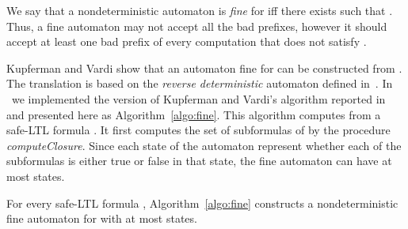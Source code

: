 We say that a nondeterministic automaton  is \emph{fine} for  iff 
there exists  such that .
Thus, a fine automaton  may not accept all the bad prefixes, however
it should accept at least one bad prefix of every computation that does not satisfy .


Kupferman and Vardi \cite{KV01,KupfermanL06} show that an automaton fine for  can
be constructed from .
The translation is based on the \emph{reverse deterministic} automaton defined 
in~\cite{VardiW94}. 
In \tool~we implemented the version of Kupferman and Vardi's algorithm reported in~\cite{Lat03} and 
presented here as Algorithm~\ref{algo:fine}. 
This algorithm computes  from a safe-LTL formula . 
It first computes the set of subformulas  of  by the procedure
\emph{computeClosure}.
Since each state of the automaton represent whether each of the subformulas is either 
true or false in that state, the fine automaton can have at most  states.

\begin{proposition}
For every safe-LTL formula , Algorithm~\ref{algo:fine} constructs a
nondeterministic fine automaton for  with at most  states. 
\end{proposition}





